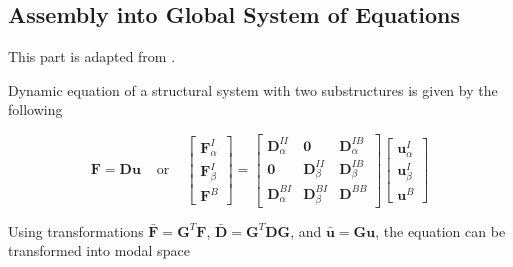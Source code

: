 \documentclass[../DomainDecomposition.tex]{subfiles}
\begin{document}
 

\subsection{Assembly into Global System of Equations} 

This part is adapted from \cite{chatterjee2021multilevel}. 
\vspace{10pt} 

Dynamic equation of a structural system with two substructures is given by the following 

\begin{equation}
    \mathbf{F} 
    =
    \mathbf{D} \mathbf{u} 
    \phantom{xx} 
    \text{or} 
    \phantom{xx} 
    \begin{bmatrix}
        \mathbf{F}_{\alpha}^{I} \\ 
        \mathbf{F}_{\beta}^{I} \\ 
        \mathbf{F}^{B} 
    \end{bmatrix}
    =
    \begin{bmatrix}
        \mathbf{D}_{\alpha}^{II} & 
        \mathbf{0} & 
        \mathbf{D}_{\alpha}^{IB} \\ 
        \mathbf{0} & 
        \mathbf{D}_{\beta}^{II} & 
        \mathbf{D}_{\beta}^{IB} \\ 
        \mathbf{D}_{\alpha}^{BI} & 
        \mathbf{D}_{\beta}^{BI} & 
        \mathbf{D}^{BB} 
    \end{bmatrix}
    \begin{bmatrix}
        \mathbf{u}_{\alpha}^{I} \\ 
        \mathbf{u}_{\beta}^{I} \\ 
        \mathbf{u}^{B} 
    \end{bmatrix}
\end{equation}

Using transformations $\bar{\mathbf{F}}=\mathbf{G}^{T}\mathbf{F}$, $\bar{\mathbf{D}}=\mathbf{G}^{T}\mathbf{D}\mathbf{G}$, and $\bar{\mathbf{u}}=\mathbf{G}\mathbf{u}$, the equation can be transformed into modal space 
\end{document}
